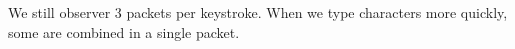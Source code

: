 We still observer 3 packets per keystroke. When we type characters more quickly, some are combined in a single packet.